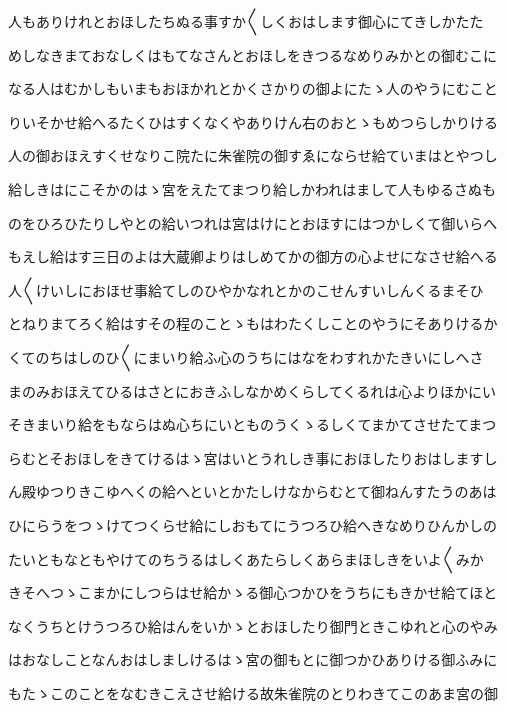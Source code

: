 \documentclass[a4paper,11pt,landscape]{ltjtarticle}
\begin{document}
\par\medskip
人もありけれとおほしたちぬる事すか〱しくおはします御心にてきしかたた
\par\medskip
めしなきまておなしくはもてなさんとおほしをきつるなめりみかとの御むこに
\par\medskip
なる人はむかしもいまもおほかれとかくさかりの御よにたゝ人のやうにむこと
\par\medskip
りいそかせ給へるたくひはすくなくやありけん右のおとゝもめつらしかりける
\par\medskip
人の御おほえすくせなりこ院たに朱雀院の御すゑにならせ給ていまはとやつし
\par\medskip
給しきはにこそかのはゝ宮をえたてまつり給しかわれはまして人もゆるさぬも
\par\medskip
のをひろひたりしやとの給いつれは宮はけにとおほすにはつかしくて御いらへ
\par\medskip
もえし給はす三日のよは大蔵卿よりはしめてかの御方の心よせになさせ給へる
\par\medskip
人〱けいしにおほせ事給てしのひやかなれとかのこせんすいしんくるまそひ
\par\medskip
とねりまてろく給はすその程のことゝもはわたくしことのやうにそありけるか
\par\medskip
くてのちはしのひ〱にまいり給ふ心のうちにはなをわすれかたきいにしへさ
\par\medskip
まのみおほえてひるはさとにおきふしなかめくらしてくるれは心よりほかにい
\par\medskip
そきまいり給をもならはぬ心ちにいとものうくゝるしくてまかてさせたてまつ
\par\medskip
らむとそおほしをきてけるはゝ宮はいとうれしき事におほしたりおはしますし
\par\medskip
ん殿ゆつりきこゆへくの給へといとかたしけなからむとて御ねんすたうのあは
\par\medskip
ひにらうをつゝけてつくらせ給にしおもてにうつろひ給へきなめりひんかしの
\par\medskip
たいともなともやけてのちうるはしくあたらしくあらまほしきをいよ〱みか
\par\medskip
きそへつゝこまかにしつらはせ給かゝる御心つかひをうちにもきかせ給てほと
\par\medskip
なくうちとけうつろひ給はんをいかゝとおほしたり御門ときこゆれと心のやみ
\par\medskip
はおなしことなんおはしましけるはゝ宮の御もとに御つかひありける御ふみに
\par\medskip
もたゝこのことをなむきこえさせ給ける故朱雀院のとりわきてこのあま宮の御
\par\medskip
\end{document}
